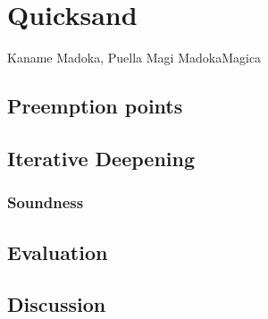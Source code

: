 \chapter{Quicksand}
\label{chap:quicksand}
{Kaname Madoka, Puella Magi Madoka{\raisebox{0.1em}{$\scriptstyle \bigstar$}}Magica}


\section{Preemption points} %
\label{sec:quicksand-pps}

\section{Iterative Deepening}
\label{sec:quicksand-id}

\subsection{Soundness}
\label{sec:quicksand-soundness}


\section{Evaluation}
\label{sec:quicksand-eval}

\section{Discussion}
\label{sec:quicksand-discussion}

